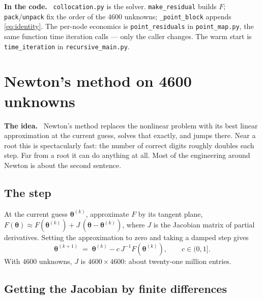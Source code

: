 \documentclass[10pt,a4paper]{article}
\newenvironment{idea}{\begin{shaded}\noindent\textbf{The idea.}\ }{\end{shaded}}
\newenvironment{incode}{\begin{leftbar}\small\noindent\textcolor{codecol}{\textbf{In the code.}}\ }{\end{leftbar}}
\theoremstyle{plain}
\theoremstyle{remark}
\newcommand{\pol}{\bm{\theta}}
\newcommand{\file}[1]{\textcolor{codecol}{\texttt{#1}}}
\newcommand{\code}[1]{\texttt{#1}}
\begin{document}
\begin{incode}
\file{collocation.py} is the solver. \code{make\_residual} builds $F$;
\code{pack}/\code{unpack} fix the order of the $4600$ unknowns; \code{\_point\_block} appends
\eqref{eq:identity}. The per-node economics is \code{point\_residuals} in \file{point\_map.py},
the same function time iteration calls --- only the caller changes. The warm start is
\code{time\_iteration} in \file{recursive\_main.py}.
\end{incode}

\section{Newton's method on 4600 unknowns}
\label{sec:newton}

\begin{idea}
Newton's method replaces the nonlinear problem with its best linear approximation at the
current guess, solves that exactly, and jumps there. Near a root this is spectacularly fast:
the number of correct digits roughly doubles each step. Far from a root it can do anything at
all. Most of the engineering around Newton is about the second sentence.
\end{idea}

\subsection{The step}

At the current guess $\pol^{(k)}$, approximate $F$ by its tangent plane,
$F(\pol) \approx F(\pol^{(k)}) + J\,(\pol-\pol^{(k)})$, where $J$ is the Jacobian matrix of
partial derivatives. Setting the approximation to zero and taking a damped step gives
\begin{equation}
  \pol^{(k+1)} \;=\; \pol^{(k)} - c\,J^{-1}F(\pol^{(k)}),\qquad c\in(0,1].
  \label{eq:newton}
\end{equation}
With $4600$ unknowns, $J$ is $4600\times4600$: about twenty-one million entries.

\subsection{Getting the Jacobian by finite differences}
\end{document}
